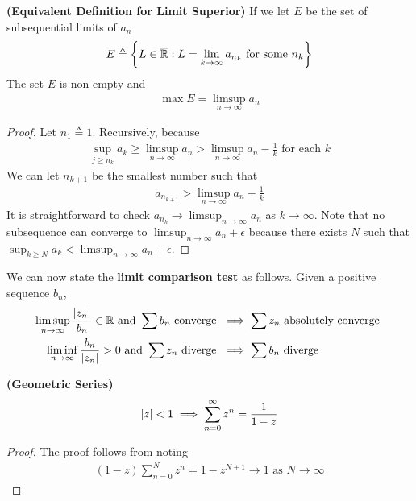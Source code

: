 \documentclass{report}
\begin{document}
\begin{theorem}
\label{Equivalent Definition for Limit Superior}
\textbf{(Equivalent Definition for Limit Superior)}
If we let $E$ be the set of subsequential limits of $a_n$
 \begin{align*}
E\triangleq \left\{ L\in\overline{\mathbb{R}}:L=\lim_{k\to \infty}a_{n_k}\text{ for some }n_k \right\}
\end{align*}
The set $E$ is non-empty and 
\begin{align*}
\max E=\limsup_{n\to\infty} a_n
\end{align*}
\end{theorem}
\begin{proof}
Let $n_1\triangleq 1$. Recursively, because
\begin{align*}
\sup_{j\geq n_k}a_k\geq \limsup_{n\to\infty} a_n>\limsup_{n\to\infty} a_n - \frac{1}{k}\text{ for each }k
\end{align*}
We can let $n_{k+1}$ be the smallest number such that 
\begin{align*}
a_{n_{k+1}}>\limsup_{n\to\infty} a_n - \frac{1}{k}
\end{align*}
It is straightforward to check $a_{n_k}\to \limsup_{n\to\infty} a_n$ as $k\to \infty$. Note that no subsequence can converge to $\limsup_{n\to\infty} a_n+\epsilon $ because there exists $N$ such that  $\sup_{k\geq N}a_k<\limsup_{n\to\infty} a_n+\epsilon $. 
\end{proof}
\begin{mdframed}
  We can now state the \textbf{limit comparison test} as follows. Given a positive sequence $b_n$, 
\begin{align*}
  \limsup_{n\to\infty} \frac{\left|z_n\right|}{b_n}\in\mathbb{R} \text{ and }\sum b_n\text{ converge }&\implies \sum z_n\text{ absolutely converge } \\
 \liminf_{n\to\infty} \frac{b_n}{\left|z_n\right|}>0\text{ and }\sum z_n \text{ diverge }&\implies \sum b_n\text{ diverge }
\end{align*}
\end{mdframed}
\begin{theorem}
\label{geometric series}
\textbf{(Geometric Series)} 
\begin{align*}
\left|z\right|< 1 \implies \sum_{n=0}^{\infty} z^n= \frac{1}{1-z}
\end{align*}
\end{theorem}
\begin{proof}
The proof follows from noting  
\begin{align*}
  (1-z)\sum_{n=0}^N z^n=1-z^{N+1}\to 1\text{ as }N\to \infty
\end{align*}
\end{proof}
\end{document}
